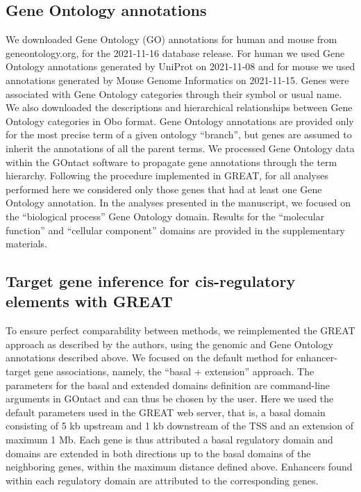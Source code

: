 \subsection{Gene Ontology annotations}
We downloaded Gene Ontology (GO) annotations for human and mouse from geneontology.org, for the 2021-11-16 database release. For human we used Gene Ontology annotations generated by UniProt on 2021-11-08 and for mouse we used annotations generated by Mouse Genome Informatics on 2021-11-15. Genes were associated with Gene Ontology categories through their symbol or usual name.  We also downloaded the descriptions and hierarchical relationships between Gene Ontology categories in Obo format. Gene Ontology annotations are provided only for the most precise term of a given ontology “branch”, but genes are assumed to inherit the annotations of all the parent terms. We processed Gene Ontology data within the GOntact software to propagate gene annotations through the term hierarchy. Following the procedure implemented in GREAT, for all analyses performed here we considered only those genes that had at least one Gene Ontology annotation. In the analyses presented in the manuscript, we focused on the “biological process” Gene Ontology domain. Results for the “molecular function” and “cellular component” domains are provided in the supplementary materials. 


\subsection{Target gene inference for \acrshort{cis}-regulatory elements with GREAT}
To ensure perfect comparability between methods, we reimplemented the GREAT approach as described by the authors, using the genomic and Gene Ontology annotations described above. We focused on the default method for enhancer-target gene associations, namely, the “basal + extension” approach. The parameters for the basal and extended domains definition are command-line arguments in GOntact and can thus be chosen by the user. Here we used the default parameters used in the GREAT web server, that is, a basal domain consisting of 5 kb upstream and 1 kb downstream of the TSS and an extension of maximum 1 Mb.  Each gene is thus attributed a basal regulatory domain and domains are extended in both directions up to the basal  domains of the neighboring genes, within the maximum distance defined above. Enhancers found within each regulatory domain are attributed to the corresponding genes. 

